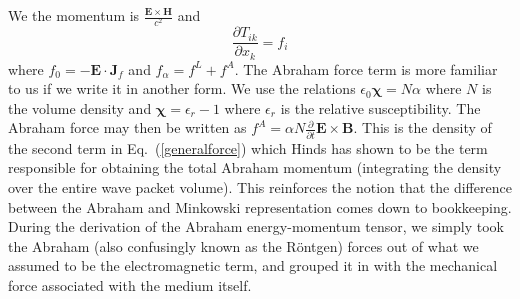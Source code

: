 We the momentum is $\frac{\mathbf{E}\times\mathbf{H}}{c^2}$ and
\begin{equation}
\frac{\partial T_{ik}}{\partial x_k}=f_i
\end{equation}
where $f_0=-\mathbf{E}\cdot\mathbf{J}_f$ and $f_{\alpha}=f^L + f^A$.  The Abraham force term is more familiar to us if we write it in another form.  We use the relations $\epsilon_0\mathbf{\chi} = N\alpha$ where $N$ is the volume density and $\mathbf{\chi}=\epsilon_r-1$ where $\epsilon_r$ is the relative susceptibility.  The Abraham force may then be written as $f^A=\alpha N\frac{\partial}{\partial t}\mathbf{E}\times\mathbf{B}$.  This is the density of the second term in Eq.\ (\ref{generalforce}) which Hinds has shown to be the term responsible for obtaining the total Abraham momentum (integrating the density over the entire wave packet volume).
This reinforces the notion that the difference between the Abraham and Minkowski representation comes down to bookkeeping.  During the derivation of the Abraham energy-momentum tensor, we simply took the Abraham (also confusingly known as the R\"{o}ntgen) forces out of what we assumed to be the electromagnetic term, and grouped it in with the mechanical force associated with the medium itself.  



